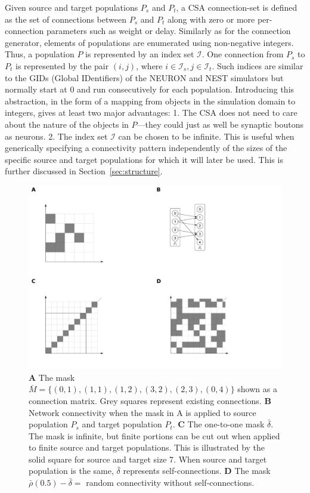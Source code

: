 \documentclass{frontiersSCNS} %
\newcommand{\INLINEFIGS}{} %
\begin{document}
Given source and target populations $P_s$ and $P_t$, a CSA
connection-set is defined as the set of connections between $P_s$ and
$P_t$ along with zero or more per-connection parameters such as weight
or delay. Similarly as for the connection generator, elements of
populations are enumerated using non-negative integers. Thus, a
population $P$ is represented by an index set $\mathcal{I}$. One
connection from $P_s$ to $P_t$ is represented by the pair $(i, j)$,
where $i \in \mathcal{I}_s, j \in \mathcal{I}_t$.  Such indices are
similar to the GIDs (Global IDentifiers) of the NEURON and NEST
simulators but normally start at 0 and run consecutively for each
population.  Introducing this abstraction, in the form of a mapping
from objects in the simulation domain to integers, gives at least two
major advantages: 1. The CSA does not need to care about the nature of
the objects in $P$---they could just as well be synaptic boutons as
neurons.  2. The index set $\mathcal{I}$ can be chosen to be
infinite. This is useful when generically specifying a connectivity
pattern independently of the sizes of the specific source and target
populations for which it will later be used. This is further discussed
in Section~\ref{sec:structure}.

\ifdefined\INLINEFIGS
\begin{figure}[ht]
\centering
\includegraphics[scale=.7]{figures/csa-pane.pdf}
\caption{
  \textbf{A} The mask $\overline{M} =
  \{(0,1), (1,1), (1,2), (3,2), (2,3), (0,4)\}$ shown as a connection
  matrix. Grey squares represent existing connections.
  \textbf{B} Network connectivity when the mask in A is applied to
  source population $P_s$ and target population
  $P_t$.
  \textbf{C} The one-to-one mask $\bar{\delta}$. The mask is infinite,
  but finite portions can be cut out when applied to finite source and
  target populations. This is illustrated by the solid square for
  source and target size 7. When source and target population is the
  same, $\bar{\delta}$ represents self-connections.
  \textbf{D} The mask $\bar{\rho}(0.5) - \bar{\delta} =$ random
  connectivity without self-connections.
}\label{fig:csa} 
\end{figure}
\fi
\end{document}
